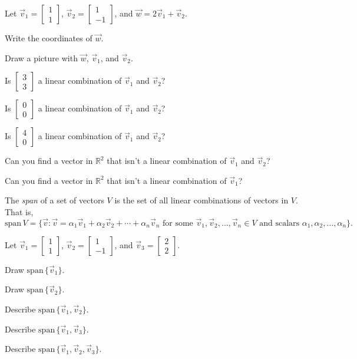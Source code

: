 \documentclass{problemset}
\newcommand{\R}{\mathbb{R}}
\newcommand{\Span}{\mathrm{span}\,}
\newcommand{\mat}[1]{\begin{bmatrix}#1\end{bmatrix}}
\begin{document}
	\question
	Let $\vec v_1=\begin{bmatrix}1\\1\end{bmatrix}$, $\vec v_2=\begin{bmatrix}1\\-1\end{bmatrix}$, and $\vec w=2\vec v_1+\vec v_2$.
	\begin{parts}
		\item Write the coordinates of $\vec w$.
		\item Draw a picture with $\vec w$, $\vec v_1$, and $\vec v_2$.
		\item Is $\mat{3\\3}$ a linear combination of $\vec v_1$ and $\vec v_2$?
		\item Is $\mat{0\\0}$ a linear combination of $\vec v_1$ and $\vec v_2$?
		\item Is $\mat{4\\0}$ a linear combination of $\vec v_1$ and $\vec v_2$?
		\item Can you find a vector in $\R^2$ that isn't a linear combination of
		$\vec v_1$ and $\vec v_2$?
		\item Can you find a vector in $\R^2$ that isn't a linear combination of
		$\vec v_1$?
	\end{parts}
	
	\begin{definition}[Span]
		The \emph{span} of a set of vectors $V$ is the set of
		all linear combinations of vectors in $V$.  That is,
		\[
			\Span V = \{\vec v:\vec v=\alpha_1\vec v_1+\alpha_2\vec v_2 + \cdots 
			+\alpha_n\vec v_n\text{ for some }\vec v_1,\vec v_2,\ldots,\vec v_n\in V
			\text{ and scalars }\alpha_1,\alpha_2,\ldots,\alpha_n\}.
		\]
	\end{definition}

	\question
	Let $\vec v_1=\mat{1\\1}$, $\vec v_2=\mat{1\\-1}$, and $\vec v_3=\mat{2\\2}$.
	\begin{parts}
		\item Draw $\Span\{\vec v_1\}$.
		\item Draw $\Span\{\vec v_2\}$.
		\item Describe $\Span\{\vec v_1,\vec v_2\}$.
		\item Describe $\Span\{\vec v_1,\vec v_3\}$.
		\item Describe $\Span\{\vec v_1,\vec v_2,\vec v_3\}$.
	\end{parts}
\end{document}
